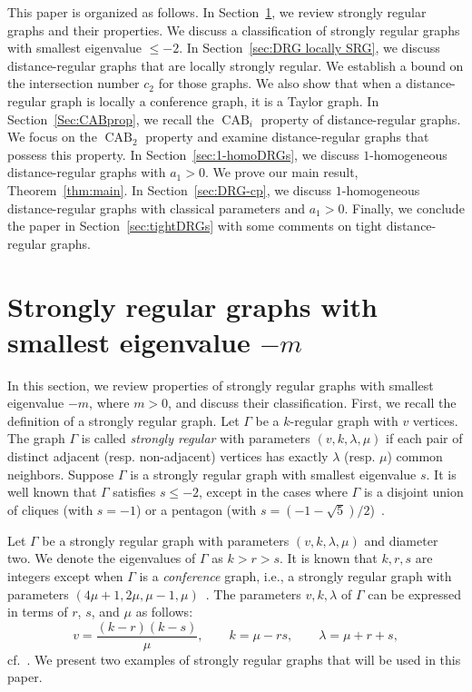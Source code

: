 \documentclass[11pt]{article}
\theoremstyle{definition}
\numberwithin{equation}{section}
\numberwithin{equation}{section}
\begin{document}
This paper is organized as follows.
In Section~\ref{sec:SRG}, we review strongly regular graphs and their properties. 
We discuss a classification of strongly regular graphs with smallest eigenvalue $\leqslant -2$.
In Section~\ref{sec:DRG locally SRG}, we discuss distance-regular graphs that are locally strongly regular. 
We establish a bound on the intersection number $c_2$ for those graphs. 
We also show that when a distance-regular graph is locally a conference graph, it is a Taylor graph.
In Section~\ref{Sec:CABprop}, we recall the $\operatorname{CAB}_i$ property of distance-regular graphs. 
We focus on the $\operatorname{CAB}_2$ property and examine distance-regular graphs that possess this property.
In Section~\ref{sec:1-homoDRGs}, we discuss $1$-homogeneous distance-regular graphs with $a_1 > 0$. 
We prove our main result, Theorem~\ref{thm:main}.
In Section~\ref{sec:DRG-cp}, we discuss $1$-homogeneous distance-regular graphs with classical parameters and $a_1 > 0$.
Finally, we conclude the paper in Section~\ref{sec:tightDRGs} with some comments on tight distance-regular graphs. 


\section{Strongly regular graphs with smallest eigenvalue \texorpdfstring{$-m$}{-m}}\label{sec:SRG}
In this section, we review properties of strongly regular graphs with smallest eigenvalue $-m$, where $m > 0$, and discuss their classification.
First, we recall the definition of a strongly regular graph.
Let $\Gamma$ be a $k$-regular graph with $v$ vertices. 
The graph $\Gamma$ is called \emph{strongly regular} with parameters $(v,k,\lambda, \mu)$ if each pair of distinct adjacent (resp. non-adjacent) vertices has exactly $\lambda$ (resp. $\mu$) common neighbors. 
Suppose $\Gamma$ is a strongly regular graph with smallest eigenvalue $s$. 
It is well known that $\Gamma$ satisfies $s \leqslant -2$, except in the cases where $\Gamma$ is a disjoint union of cliques (with $s = -1$) or a pentagon (with $s = (-1 - \sqrt{5})/{2}$)~\cite[Section 1.1.10]{BrVM2022}.

Let $\Gamma$ be a strongly regular graph with parameters $(v,k,\lambda,\mu)$ and diameter two.
We denote the eigenvalues of $\Gamma$ as $k>r>s$. 
It is known that $k,r,s$ are integers except when $\Gamma$ is a \emph{conference} graph, i.e., a strongly regular graph with parameters $(4\mu +1, 2\mu, \mu-1,\mu)$~\cite[Lemma 10.3.3]{GR01}. 
The parameters $v, k, \lambda$ of $\Gamma$ can be expressed in terms of $r$, $s$, and $\mu$ as follows:
\begin{equation}\label{SRG parameters}
	  v = \frac{(k-r)(k-s)}{\mu}, \qquad 
	  k= \mu -rs, \qquad 
	  \lambda = \mu +r +s,
\end{equation}
cf.~\cite[Theorem 1.3.1]{BCN}.
We present two examples of strongly regular graphs that will be used in this paper.
\end{document}
